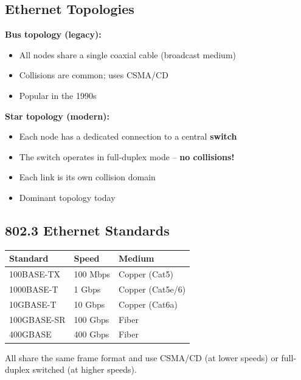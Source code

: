 \subsection{Ethernet Topologies}

\begin{keybox}
\textbf{Bus topology (legacy):}
\begin{itemize}[noitemsep]
    \item All nodes share a single coaxial cable (broadcast medium)
    \item Collisions are common; uses CSMA/CD
    \item Popular in the 1990s
\end{itemize}

\textbf{Star topology (modern):}
\begin{itemize}[noitemsep]
    \item Each node has a dedicated connection to a central \textbf{switch}
    \item The switch operates in full-duplex mode -- \textbf{no collisions!}
    \item Each link is its own collision domain
    \item Dominant topology today
\end{itemize}
\end{keybox}

\subsection{802.3 Ethernet Standards}

\begin{keybox}
\begin{center}
\begin{tabular}{lll}
\toprule
\textbf{Standard} & \textbf{Speed} & \textbf{Medium} \\
\midrule
100BASE-TX & 100 Mbps & Copper (Cat5) \\
1000BASE-T & 1 Gbps & Copper (Cat5e/6) \\
10GBASE-T & 10 Gbps & Copper (Cat6a) \\
100GBASE-SR & 100 Gbps & Fiber \\
400GBASE & 400 Gbps & Fiber \\
\bottomrule
\end{tabular}
\end{center}

All share the same frame format and use CSMA/CD (at lower speeds) or full-duplex switched (at higher speeds).
\end{keybox}

